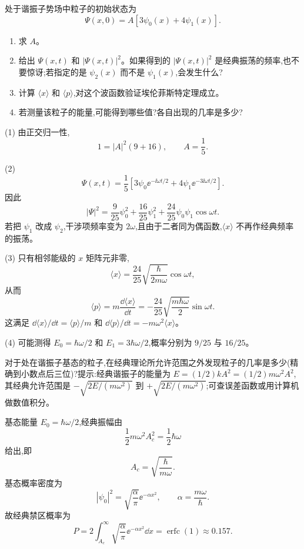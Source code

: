 \begin{question}
处于谐振子势场中粒子的初始状态为
\[
\Psi(x,0)=A[3\psi_0(x)+4\psi_1(x)].
\]
\begin{enumerate}
\item 求 $A$。
\item 给出 $\Psi(x,t)$ 和 $|\Psi(x,t)|^2$。如果得到的 $|\Psi(x,t)|^2$ 是经典振荡的频率,也不要惊讶;若指定的是 $\psi_2(x)$ 而不是 $\psi_1(x)$,会发生什么?
\item 计算 $\langle x\rangle$ 和 $\langle p\rangle$,对这个波函数验证埃伦菲斯特定理成立。
\item 若测量该粒子的能量,可能得到哪些值?各自出现的几率是多少?
\end{enumerate}
\begin{solution}
(1) 由正交归一性,
\[
1=|A|^2(9+16),
\qquad A=\frac15.
\]

(2) 
\[
\Psi(x,t)=\frac15\left[3\psi_0\ee^{-\ii\omega t/2}+4\psi_1\ee^{-3\ii\omega t/2}\right].
\]
因此
\[
|\Psi|^2=\frac{9}{25}\psi_0^2+\frac{16}{25}\psi_1^2+\frac{24}{25}\psi_0\psi_1\cos\omega t.
\]
若把 $\psi_1$ 改成 $\psi_2$,干涉项频率变为 $2\omega$,且由于二者同为偶函数,$\langle x\rangle$ 不再作经典频率的振荡。

(3) 只有相邻能级的 $x$ 矩阵元非零,
\[
\langle x\rangle=\frac{24}{25}\sqrt{\frac{\hbar}{2m\omega}}\cos\omega t,
\]
从而
\[
\langle p\rangle=m\frac{\dd\langle x\rangle}{\dd t}
=-\frac{24}{25}\sqrt{\frac{m\hbar\omega}{2}}\sin\omega t.
\]
这满足 $\dd\langle x\rangle/\dd t=\langle p\rangle/m$ 和 $\dd\langle p\rangle/\dd t=-m\omega^2\langle x\rangle$。

(4) 可能测得 $E_0=\hbar\omega/2$ 和 $E_1=3\hbar\omega/2$,概率分别为 $9/25$ 与 $16/25$。
\end{solution}
\end{question}

\begin{question}
对于处在谐振子基态的粒子,在经典理论所允许范围之外发现粒子的几率是多少(精确到小数点后三位)?提示:经典谐振子的能量为 $E=(1/2)kA^2=(1/2)m\omega^2A^2$,其经典允许范围是 $-\sqrt{2E/(m\omega^2)}$ 到 $+\sqrt{2E/(m\omega^2)}$;可查误差函数或用计算机做数值积分。
\begin{solution}
基态能量 $E_0=\hbar\omega/2$,经典振幅由
\[
\frac12m\omega^2A_c^2=\frac12\hbar\omega
\]
给出,即
\[
A_c=\sqrt{\frac{\hbar}{m\omega}}.
\]
基态概率密度为
\[
|\psi_0|^2=\sqrt{\frac{\alpha}{\pi}}\ee^{-\alpha x^2},
\qquad \alpha=\frac{m\omega}{\hbar}.
\]
故经典禁区概率为
\[
P=2\int_{A_c}^{\infty}\sqrt{\frac{\alpha}{\pi}}\ee^{-\alpha x^2}\dd x
=\operatorname{erfc}(1)
\approx 0.157.
\]
\end{solution}
\end{question}

